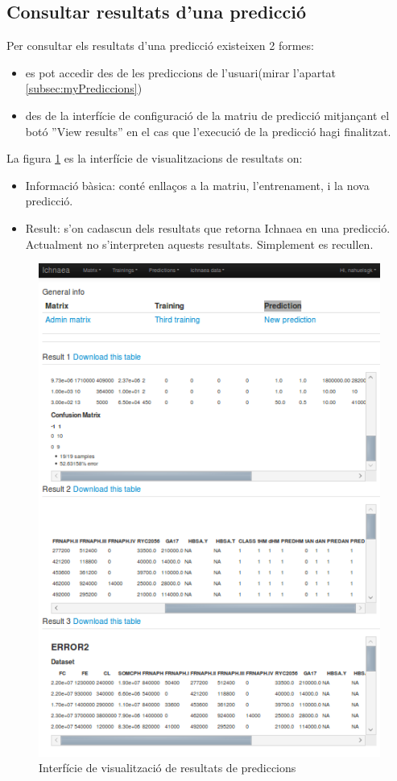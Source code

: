 \subsection{Consultar resultats d'una predicció}
Per consultar els resultats d'una predicció existeixen 2 formes:
\begin{itemize}
\item es pot accedir des de les prediccions de l'usuari(mirar l'apartat \ref{subsec:myPrediccions}) 
\item des de la interfície de configuració de la matriu de predicció mitjançant el bot\'{o} ''View results'' en el cas que l'execució de la predicció hagi finalitzat.
\end{itemize}
La figura \ref{fig:viewresults} es la interfície de visualitzacions de resultats on:
\begin{itemize}
\item Informació bàsica: cont\'{e} enllaços a la matriu, l'entrenament, i la nova predicció.
\item Result: s'{o}n cadascun dels resultats que retorna Ichnaea en una predicció. Actualment no s'interpreten aquests resultats. Simplement es recullen.
\end{itemize}
\begin{figure}[h!]
  \centering
  \includegraphics[scale=0.5]{img/userguide/result_prediction_gui.png}
  \caption{Interfície de visualització de resultats de prediccions}
  \label{fig:viewresults}
\end{figure}

